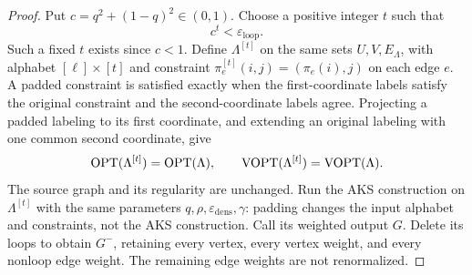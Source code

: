 \begin{proof}
Put $c=q^2+(1-q)^2\in(0,1)$.
Choose a positive integer $t$ such that
\begin{equation}\label{eq:aks-padding-choice}
 c^t<\varepsilon_{\mathrm{loop}}.
\end{equation}
Such a fixed $t$ exists since $c<1$.
Define $\Lambda^{[t]}$
on the same sets $U,V,E_\Lambda$, with alphabet $[\ell]\times[t]$
and constraint
$\pi_e^{[t]}(i,j)=(\pi_e(i),j)$ on each edge $e$.
A padded constraint is satisfied exactly when the first-coordinate
labels satisfy the original constraint and the second-coordinate
labels agree.
Projecting a padded labeling to its first coordinate, and extending
an original labeling with one common second coordinate, give
\[
 \operatorname{OPT}(\Lambda^{[t]})=\operatorname{OPT}(\Lambda),\qquad
 \operatorname{VOPT}(\Lambda^{[t]})=\operatorname{VOPT}(\Lambda).
\]
The source graph and its regularity are unchanged. Run the AKS
construction on $\Lambda^{[t]}$ with the same
parameters $q,\rho,\varepsilon_{\mathrm{dens}},\gamma$: padding changes
the input alphabet and constraints, not the AKS construction.
Call its weighted output $G$. Delete its loops to obtain $G^-$,
retaining every vertex, every vertex weight, and every nonloop edge
weight. The remaining edge weights are not renormalized.


\end{proof}
